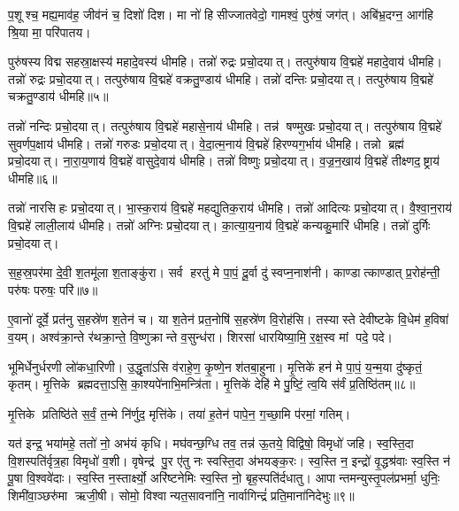 प॒शूश्च॒ मह्य॒माव॑ह॒ जीव॑नं च॒ दिशो॑ दिश। 
मा नो॑ हिसीज्जातवेदो॒ गामश्वं॒ पुरु॑षं॒ जग॑त्। 
अबि॑भ्र॒दग्न॒ आग॑हि श्रि॒या मा॒ परि॑पातय।


 पुरु॑षस्य विद्म सहस्रा॒क्षस्य॑ महादे॒वस्य॑ धीमहि। 
 तन्नो॑ रुद्रः प्रचो॒दयात्। 
 तत्पुरु॑षाय वि॒द्महे॑ महादे॒वाय॑ धीमहि। 
 तन्नो॑ रुद्रः प्रचो॒दयात्। 
 तत्पुरु॑षाय वि॒द्महे॑ वक्रतु॒ण्डाय॑ धीमहि। 
 तन्नो॑ दन्तिः प्रचो॒दयात्। 
 तत्पुरु॑षाय वि॒द्महे॑ चक्रतु॒ण्डाय॑ धीमहि॥५॥

 तन्नो॑ नन्दिः प्रचो॒दयात्। 
 तत्पुरु॑षाय वि॒द्महे॑ महासे॒नाय॑ धीमहि। 
 तन्न॑ षण्मुखः प्रचो॒दयात्। 
 तत्पुरु॑षाय वि॒द्महे॑ सुवर्णप॒क्षाय॑ धीमहि। 
 तन्नो॑ गरुडः प्रचो॒दयात्। 
 वे॒दा॒त्म॒नाय॑ वि॒द्महे॑ हिरण्यग॒र्भाय॑ धीमहि। 
 तन्नो ब्रह्म॑ प्रचो॒दयात्। 
 ना॒रा॒य॒णाय॑ वि॒द्महे॑ वासुदे॒वाय॑ धीमहि। 
 तन्नो॑ विष्णुः प्रचो॒दयात्। 
 व॒ज्र॒न॒खाय॑ वि॒द्महे॑ तीक्ष्णद॒ष्ट्राय॑ धीमहि॥६॥
 
तन्नो॑ नारसिहः प्रचो॒दयात्। 
भा॒स्क॒राय॑ वि॒द्महे॑ महद्युतिक॒राय॑ धीमहि। 
तन्नो॑ आदित्यः प्रचो॒दयात्। 
वै॒श्वा॒न॒राय॑ वि॒द्महे॑ लाली॒लाय॑ धीमहि। 
तन्नो॑ अग्निः प्रचो॒दयात्। 
का॒त्या॒य॒नाय॑ वि॒द्महे॑ कन्यकु॒मारि॑ धीमहि। 
तन्नो॑ दुर्गिः प्रचो॒दयात्। 


स॒ह॒स्र॒पर॑मा दे॒वी॒ श॒तमू॑ला श॒ताङ्कु॑रा। 
सर्व हरतु॑ मे पा॒पं॒ दू॒र्वा दु॑स्वप्न॒नाश॑नी। 
काण्डात्काण्डात् प्र॒रोह॑न्ती॒ परु॑षः परुषः॒ परि॑॥७॥

ए॒वानो॑ दूर्वे॒ प्रत॑नु स॒हस्रे॑ण श॒तेन॑ च। 
या श॒तेन॑ प्रत॒नोषि॑ स॒हस्रे॑ण वि॒रोह॑सि। 
तस्यास्ते देवीष्टके वि॒धेम॑ ह॒विषा॑ व॒यम्। 
अश्व॑क्रा॒न्ते र॑थक्रा॒न्ते॒ वि॒ष्णुक्रान्ते व॒सुन्ध॑रा। 
शिरसा॑ धारयिष्या॒मि॒ र॒क्ष॒स्व मां पदे॒ पदे।

 भूमिर्धेनुर्धरणी लो॑कधा॒रिणी। 
 उ॒द्धृता॑ऽसि व॑राहे॒ण॒ कृ॒ष्णे॒न श॑तबा॒हुना। 
 मृ॒त्तिके॑ हन॑ मे पा॒पं॒ य॒न्म॒या दु॑ष्कृतं॒ कृतम्। 
 मृ॒त्तिके ब्रह्मदत्ता॒ऽसि॒ का॒श्यपे॑नाभि॒मन्त्रि॑ता। 
 मृ॒त्तिके॑ देहि॑ मे पु॒ष्टिं॒ त्व॒यि स॑र्वं प्र॒तिष्ठि॑तम्॥८॥
 
 मृ॒त्तिके प्रतिष्ठि॑ते स॒र्वं॒ त॒न्मे नि॑र्णुद॒ मृत्ति॑के। 
 तया॑ ह॒तेन॑ पापे॒न॒ ग॒च्छा॒मि प॑रमां॒ गतिम्।

यत॑ इन्द्र॒ भया॑महे॒ ततो॑ नो॒ अभ॑यं कृधि। 
मघ॑वन्छ॒ग्धि तव॒ तन्न॑ ऊ॒तये॒ विद्विषो॒ विमृधो॑ जहि। 
स्व॒स्ति॒दा वि॒शस्पति॑र्वृत्र॒हा विमृधो॑ व॒शी। 
वृषेन्द्र॑ पु॒र ए॑तु नः स्वस्ति॒दा अ॑भयङ्क॒रः। 
स्व॒स्ति न॒ इन्द्रो॑ वृ॒द्धश्र॑वाः स्व॒स्ति न॑ पू॒षा वि॒श्ववे॑दाः। 
स्व॒स्ति न॒स्तार्क्ष्यो॒ अरि॑ष्टनेमिः स्व॒स्ति नो॒ बृह॒स्पति॑र्दधातु। 
आपान्तमन्युस्तृ॒पल॑प्रभर्मा॒ धुनिः॒ शिमी॑वा॒ञ्छरु॑मा ऋजी॒षी। 
सोमो॒ विश्वान्यत॒सावना॑नि॒ नार्वागिन्द्रं॑ प्रति॒माना॑निदेभुः॥९॥

